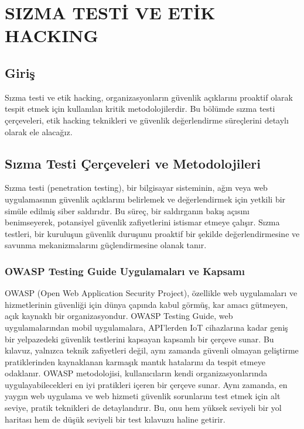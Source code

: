 ﻿\chapter{SIZMA TESTİ VE ETİK HACKING}

\section*{Giriş}
Sızma testi ve etik hacking, organizasyonların güvenlik açıklarını proaktif olarak tespit etmek için kullanılan kritik metodolojilerdir. Bu bölümde sızma testi çerçeveleri, etik hacking teknikleri ve güvenlik değerlendirme süreçlerini detaylı olarak ele alacağız.

\section{Sızma Testi Çerçeveleri ve Metodolojileri}

Sızma testi (penetration testing), bir bilgisayar sisteminin, ağın veya web uygulamasının güvenlik açıklarını belirlemek ve değerlendirmek için yetkili bir simüle edilmiş siber saldırıdır. Bu süreç, bir saldırganın bakış açısını benimseyerek, potansiyel güvenlik zafiyetlerini istismar etmeye çalışır. Sızma testleri, bir kuruluşun güvenlik duruşunu proaktif bir şekilde değerlendirmesine ve savunma mekanizmalarını güçlendirmesine olanak tanır.

\subsection{OWASP Testing Guide Uygulamaları ve Kapsamı}

OWASP (Open Web Application Security Project), özellikle web uygulamaları ve hizmetlerinin güvenliği için dünya çapında kabul görmüş, kar amacı gütmeyen, açık kaynaklı bir organizasyondur. OWASP Testing Guide, web uygulamalarından mobil uygulamalara, API'lerden IoT cihazlarına kadar geniş bir yelpazedeki güvenlik testlerini kapsayan kapsamlı bir çerçeve sunar. Bu kılavuz, yalnızca teknik zafiyetleri değil, aynı zamanda güvenli olmayan geliştirme pratiklerinden kaynaklanan karmaşık mantık hatalarını da tespit etmeye odaklanır.
OWASP metodolojisi, kullanıcıların kendi organizasyonlarında uygulayabilecekleri en iyi pratikleri içeren bir çerçeve sunar. Aynı zamanda, en yaygın web uygulama ve web hizmeti güvenlik sorunlarını test etmek için alt seviye, pratik teknikleri de detaylandırır. Bu, onu hem yüksek seviyeli bir yol haritası hem de düşük seviyeli bir test kılavuzu haline getirir.

